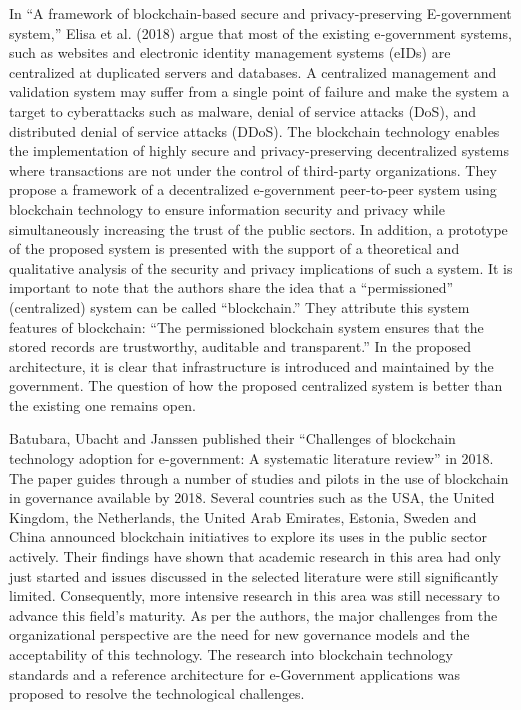 \begin{multicols}{2}
In “A framework of blockchain-based secure and privacy-preserving E-government system,” \cite{art1-key10} Elisa et al. (2018) argue that most of the existing e‑government systems, such as websites and electronic identity management systems (eIDs) are centralized at duplicated servers and databases. A centralized management and validation system may suffer from a single point of failure and make the system a target to cyberattacks such as malware, denial of service attacks (DoS), and distributed denial of service attacks (DDoS). The blockchain technology enables the implementation of highly secure and privacy-preserving decentralized systems where transactions are not under the control of third-party organizations. They propose a framework of a decentralized e-government peer-to-peer system using blockchain technology to ensure information security and privacy while simultaneously increasing the trust of the public sectors. In addition, a prototype of the proposed system is presented with the support of a theoretical and qualitative analysis of the security and privacy implications of such a system. It is important to note that the authors share the idea that a “permissioned” (centralized) system can be called “blockchain.” They attribute this system features of blockchain: “The permissioned blockchain system ensures that the stored records are trustworthy, auditable and transparent.” In the proposed architecture, it is clear that infrastructure is introduced and maintained by the government. The question of how the proposed centralized system is better than the existing one remains open.

Batubara, Ubacht and Janssen published their “Challenges of blockchain technology adoption for e-government: A systematic literature review” \cite{art1-key11} in 2018. The paper guides through a number of studies and pilots in the use of blockchain in governance available by 2018. Several countries such as the USA, the United Kingdom, the Netherlands, the United Arab Emirates, Estonia, Sweden and China announced blockchain initiatives to explore its uses in the public sector actively. Their findings have shown that academic research in this area had only just started and issues discussed in the selected literature were still significantly limited. Consequently, more intensive research in this area was still necessary to advance this field's maturity. As per the authors, the major challenges from the organizational perspective are the need for new governance models and the acceptability of this technology. The research into blockchain technology standards and a reference architecture for e-Government applications was proposed to resolve the technological challenges.


\end{multicols}
